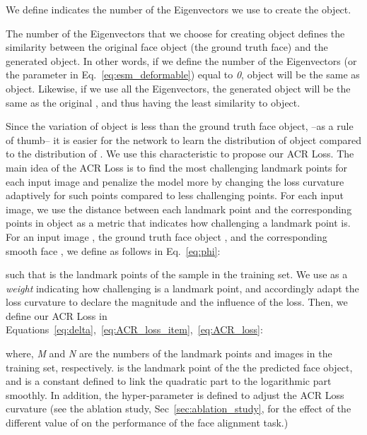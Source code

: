 \documentclass[a4paper,conference]{IEEEtran}
\begin{document}
We define  indicates the number of the Eigenvectors we use to create the  object. 

The number of the Eigenvectors that we choose for creating  object defines the similarity between the original face object (the ground truth face) and the generated   object. In other words, if we define the number of the Eigenvectors (or the parameter  in Eq.~\ref{eq:esm_deformable}) equal to \textit{0},   object will be the same as  object. Likewise, if we use all the Eigenvectors, the generated   object will be the same as the original  , and thus having the least similarity to   object.

Since the variation of  object is less than the ground truth face object, --as a rule of thumb-- it is easier for the network to learn the distribution of   object compared to the distribution of  . We use this characteristic to propose our ACR Loss. The main idea of the ACR Loss is to find the most challenging landmark points for each input image and penalize the model more by changing the loss curvature adaptively for such points compared to less challenging points. For each input image, we use the distance between each landmark point and the corresponding points in   object as a metric that indicates how challenging a landmark point is. For an input image , the ground truth face object , and the corresponding smooth face , we define  as follows in Eq.~\ref{eq:phi}:

such that  is the  landmark points of the  sample in the training set. We use  as a \textit{weight} indicating how challenging is a landmark point, and accordingly adapt the loss curvature to declare the magnitude and the influence of the loss. Then, we define our ACR Loss in Equations~\ref{eq:delta},~\ref{eq:ACR_loss_item},~\ref{eq:ACR_loss}:



where, \textit{M} and \textit{N} are the numbers of the landmark points and images in the training set, respectively.  is the  landmark point of the  the predicted face object, and  is a constant defined to link the quadratic part to the logarithmic part smoothly. In addition, the hyper-parameter  is defined to adjust the ACR Loss curvature (see the ablation study, Sec~\ref{sec:ablation_study}, for the effect of the different value of  on the performance of the face alignment task.)
\end{document}
